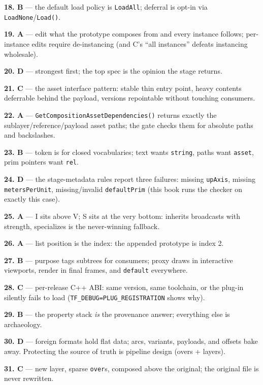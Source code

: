 \noindent\textbf{18. B} --- the default load policy is \texttt{LoadAll};
deferral is opt-in via \texttt{LoadNone}/\texttt{Load()}.

\noindent\textbf{19. A} --- edit what the prototype composes from and every
instance follows; per-instance edits require de-instancing (and C's
``all instances'' defeats instancing wholesale).

\noindent\textbf{20. D} --- strongest first; the top spec is the opinion the
stage returns.

\noindent\textbf{21. C} --- the asset interface pattern: stable thin entry
point, heavy contents deferrable behind the payload, versions repointable
without touching consumers.

\noindent\textbf{22. A} --- \texttt{GetCompositionAssetDependencies()}
returns exactly the sublayer/reference/payload asset paths; the gate checks
them for absolute paths and backslashes.

\noindent\textbf{23. B} --- token is for closed vocabularies; text wants
\texttt{string}, paths want \texttt{asset}, prim pointers want \texttt{rel}.

\noindent\textbf{24. D} --- the stage-metadata rules report three failures:
missing \texttt{upAxis}, missing \texttt{metersPerUnit}, missing/invalid
\texttt{defaultPrim} (this book runs the checker on exactly this case).

\noindent\textbf{25. A} --- I sits above V; S sits at the very bottom:
inherits broadcasts with strength, specializes is the never-winning
fallback.

\noindent\textbf{26. A} --- list position is the index: the appended
prototype is index 2.

\noindent\textbf{27. B} --- purpose tags subtrees for consumers; proxy
draws in interactive viewports, render in final frames, and
\texttt{default} everywhere.

\noindent\textbf{28. C} --- per-release C++ ABI: same version, same
toolchain, or the plug-in silently fails to load
(\texttt{TF\_DEBUG=PLUG\_REGISTRATION} shows why).

\noindent\textbf{29. B} --- the property stack \emph{is} the provenance
answer; everything else is archaeology.

\noindent\textbf{30. D} --- foreign formats hold flat data; arcs, variants,
payloads, and offsets bake away. Protecting the source of truth is pipeline
design (overs + layers).

\noindent\textbf{31. C} --- new layer, sparse \texttt{over}s, composed above
the original; the original file is never rewritten.

